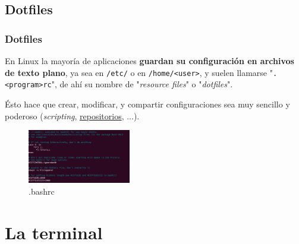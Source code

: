 \documentclass[aspectratio=43]{beamer}
\begin{document}
\subsection{Dotfiles}

\begin{frame}
    \frametitle{Dotfiles}
    En Linux la mayoría de aplicaciones \textbf{guardan su configuración en archivos de texto plano}, ya sea en \texttt{/etc/} o en \texttt{/home/<user>}, y suelen llamarse "\texttt{.<program>rc}", de ahí su nombre de "\textit{resource files}" o "\textit{dotfiles}".\newline

    Ésto hace que crear, modificar, y compartir configuraciones sea muy sencillo y poderoso (\textit{scripting}, \href{https://github.com/rajayonin/dotfiles}{repositorios}, ...).

    \begin{figure}
        \centering
        \includegraphics[width=0.4\textwidth]{img/bashrc.png}
        \caption{.bashrc}
    \end{figure}


\end{frame}


\section{La terminal}
\end{document}
